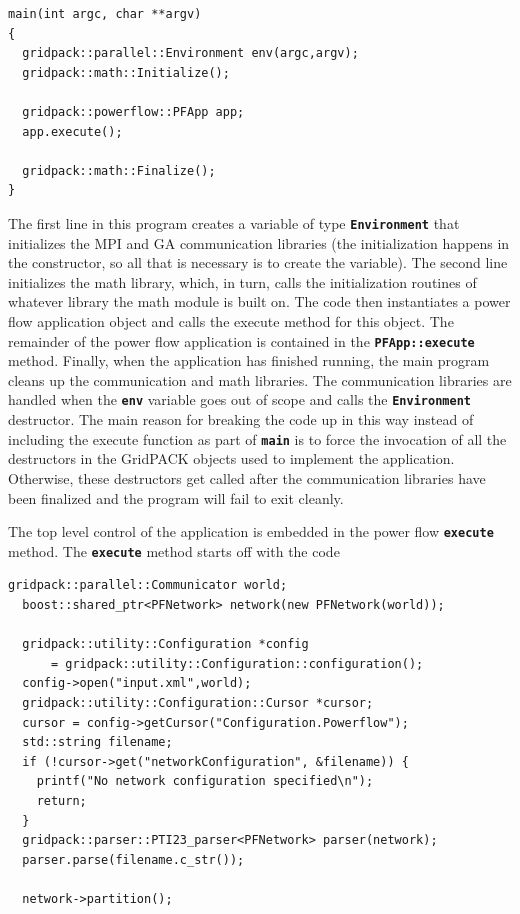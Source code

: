 {
\color{red}
\begin{Verbatim}[fontseries=b]
main(int argc, char **argv)
{
  gridpack::parallel::Environment env(argc,argv);
  gridpack::math::Initialize();

  gridpack::powerflow::PFApp app;
  app.execute();

  gridpack::math::Finalize();
}
\end{Verbatim}
}

The first line in this program creates a variable of type \texttt{\textbf{Environment}} that initializes the MPI and GA communication libraries (the initialization happens in the constructor, so all that is necessary is to create the variable). The second line initializes the math library, which, in turn, calls the initialization routines of whatever library the math module is built on. The code then instantiates a power flow application object and calls the execute method for this object. The remainder of the power flow application is contained in the \texttt{\textbf{PFApp::execute}} method. Finally, when the application has finished running, the main program cleans up the communication and math libraries. The communication libraries are handled when the \texttt{\textbf{env}} variable goes out of scope and calls the \texttt{\textbf{Environment}} destructor. The main reason for breaking the code up in this way instead of including the execute function as part of \texttt{\textbf{main}} is to force the invocation of all the destructors in the GridPACK objects used to implement the application. Otherwise, these destructors get called after the communication libraries have been finalized and the program will fail to exit cleanly.

The top level control of the application is embedded in the power flow \texttt{\textbf{execute}} method. The \texttt{\textbf{execute}} method starts off with the code

{
\color{red}
\begin{Verbatim}[fontseries=b]
  gridpack::parallel::Communicator world;
  boost::shared_ptr<PFNetwork> network(new PFNetwork(world));

  gridpack::utility::Configuration *config
      = gridpack::utility::Configuration::configuration();
  config->open("input.xml",world);
  gridpack::utility::Configuration::Cursor *cursor;
  cursor = config->getCursor("Configuration.Powerflow");
  std::string filename;
  if (!cursor->get("networkConfiguration", &filename)) {
    printf("No network configuration specified\n");
    return;
  }
  gridpack::parser::PTI23_parser<PFNetwork> parser(network);
  parser.parse(filename.c_str());
  
  network->partition();
\end{Verbatim}
}

